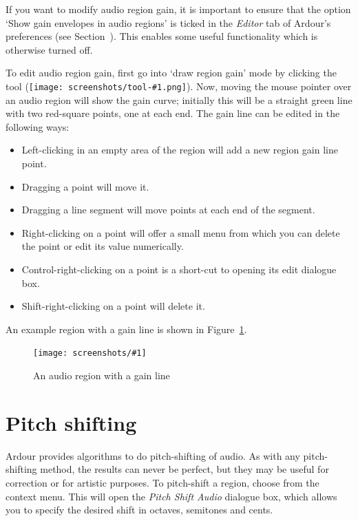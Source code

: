 \documentclass[10pt,a4paper]{book}
\newcommand{\menu}[1]{\emph{\StrSubstitute{#1}{,}{ $\rightarrow$ }}}
\newcommand{\todo}[1]{\marginpar{\small\texttt{#1}}}
\newcommand{\modone}{Control}
\newcommand{\modtertiary}{Shift}
\newcommand{\screenshot}[3]{%
\begin{figure}[ht]%
\begin{center}
\texttt{[image: screenshots/\#1]}
\end{center}
\caption{#2}
\label{#3}
\end{figure}}
\newcommand{\inlinetool}[1]{\texttt{[image: screenshots/tool-\#1.png]}}
\begin{document}
{If you want to modify audio region gain, it is important to ensure
that the option `Show gain envelopes in audio regions' is ticked in
the \emph{Editor} tab of Ardour's preferences (see
Section~\label{sec:ardour-preferences-editor}).  This enables some
useful functionality which is otherwise turned off.

To edit audio region gain, first go into `draw region gain' mode by
clicking the tool (\inlinetool{region-gain}).  Now,
moving the mouse pointer over an audio region will show the gain
curve; initially this will be a straight green line with two
red-square points, one at each end.  The gain line can be edited in
the following ways:

\begin{itemize}
\item Left-clicking in an empty area of the region will add a new
  region gain line point.
\item Dragging a point will move it.
\item Dragging a line segment will move points at each end of the segment.
\item Right-clicking on a point will offer a small
  menu from which you can delete the point or edit its value
  numerically.
\item \modone{}-right-clicking on a point is a short-cut to opening
  its edit dialogue box.
\item \modtertiary{}-right-clicking on a point will delete it.
\end{itemize}

An example region with a gain line is shown in
Figure~\ref{fig:region-with-gain-line}.

\screenshot{region-gain-line.png}{An audio region with a gain line}{fig:region-with-gain-line}




\section{Pitch shifting}

Ardour provides algorithms to do pitch-shifting of audio.  As with any
pitch-shifting method, the results can never be perfect, but they may
be useful for correction or for artistic purposes.  To pitch-shift a
region, choose \menu{Edit,Pitch Shift\ldots} from the context menu.
This will open the \emph{Pitch Shift Audio} dialogue box, which allows
you to specify the desired shift in octaves, semitones and cents.

\todo{Preserve Formants?}


}
\end{document}
